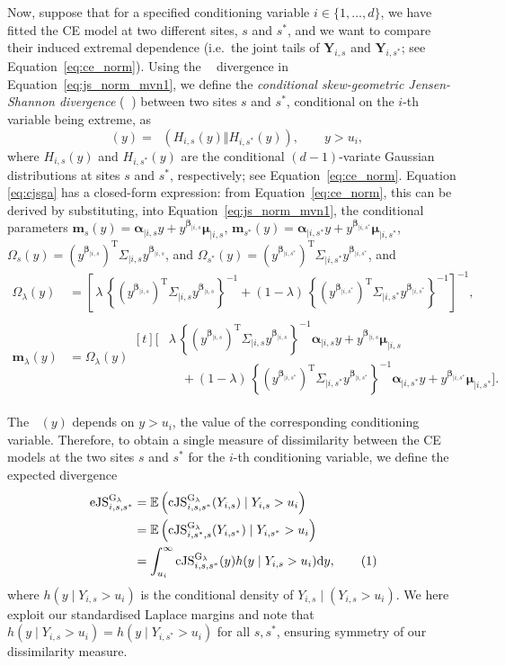 \documentclass[12pt,compact]{article}
\newcommand{\JSGa}{\mathop{\mathrm{JS}^{\mathrm{G}_{\lambda}}}\nolimits}
\newcommand{\cJSGa}[1]{\mathop{\mathrm{cJS}_{i, #1}^{\mathrm{G}_{\lambda}}}\nolimits}
\newcommand{\eJSGa}[1]{\mathop{\mathrm{eJS}_{i, #1}^{\mathrm{G}_{\lambda}}}\nolimits}
\newcommand\numberthis{\addtocounter{equation}{1}\tag{\theequation}}
\newcommand{\mvmean}[1]{\symbf{\alpha}_{\mid i, #1} y + y^{\symbf{\beta}_{\mid i, #1}} \symbf{\mu}_{\mid i, #1}}
\newcommand{\mvcov}[1]{\left(y^{\symbf{\beta}_{\mid i, #1}}\right)^{\mathrm{T}} \Sigma_{\mid i, #1} y^{\symbf{\beta}_{\mid i, #1}}}
\begin{document}
Now, suppose that for a specified conditioning variable $i \in \{1, \ldots, d\}$, we have fitted the CE model at two different sites, $s$ and $s^*$, and we want to compare their induced extremal dependence (i.e.\ the joint tails of $\boldsymbol{Y}_{i, s}$ and $\boldsymbol{Y}_{i, s^*}$; see Equation~\eqref{eq:ce_norm}). 
Using the $\JSGa{}$ divergence in Equation~\eqref{eq:js_norm_mvn1}, we define the \textit{conditional skew-geometric Jensen-Shannon divergence} ($\cJSGa{s, s^*}$) between two sites $s$ and $s^*$, conditional on the $i$-th variable being extreme, as
\begin{equation}\label{eq:cjsga}
  \cJSGa{s, s^*}(y) = \JSGa{}\left(H_{i, s}(y) \Vert H_{i, s^*}(y)\right),\qquad y > u_i,
\end{equation}
where $H_{i, s}(y)$ and $H_{i, s^*}(y)$ are the conditional $(d-1)$-variate Gaussian distributions at sites $s$ and $s^*$, respectively; see Equation~\eqref{eq:ce_norm}.
Equation \eqref{eq:cjsga} has a closed-form expression: from Equation~\eqref{eq:ce_norm}, this can be derived by substituting, into Equation~\eqref{eq:js_norm_mvn1}, the conditional parameters $\symbf{m}_{s}(y) = \mvmean{s}$, $\symbf{m}_{s^*}(y) = \mvmean{s^*}$, $\Omega_{s}(y) = \mvcov{s}$, and $\Omega_{s^*}(y) = \mvcov{s^*}$, 
and 
\begin{align*}
\Omega_{\lambda}(y)
  &= \left[\,\lambda\,\left\{\mvcov{s}\right\}^{-1}
           +(1-\lambda)\,\left\{\mvcov{s^{*}}\right\}^{-1}\right]^{-1},\\[6pt]
\symbf{m}_{\lambda}(y)
  &= \Omega_{\lambda}(y)
     \begin{aligned}[t]
       \Biggl[&\lambda\,\left\{\mvcov{s}\right\}^{-1}\mvmean{s}\\
            &\quad +(1-\lambda)\,\left\{\mvcov{s^{*}}\right\}^{-1}\mvmean{s^{*}}\Biggr].
     \end{aligned}
\end{align*}

The $\cJSGa{s, s^*}(y)$ depends on $y > u_i$, the value of the corresponding conditioning variable. 
Therefore, to obtain a single measure of dissimilarity between the CE models at the two sites $s$ and $s^*$ for the $i$-th conditioning variable, we define the expected divergence
\begin{align*}
  \eJSGa{s, s^*} &= \mathbb{E}\left(\cJSGa{s, s^*}(Y_{i,s}) \mid Y_{i,s} > u_i\right) \\
                 &= \mathbb{E}\left(\cJSGa{s^*, s}(Y_{i,s^*}) \mid Y_{i,s^*} > u_i\right) \\
                 &= \int_{u_i}^{\infty} \cJSGa{s, s^*}(y) h(y \mid Y_{i,s} > u_i) \mathrm{d}y, \numberthis \label{eq:jsga_integral}
\end{align*}
where $h(y \mid Y_{i, s} > u_i)$ is the conditional density of $Y_{i, s} \mid (Y_{i, s} > u_i)$.
We here exploit our standardised Laplace margins and note that $h(y \mid Y_{i, s} > u_i) = h(y \mid Y_{i, s^*} > u_i)$ for all $s, s^*$, ensuring symmetry of our dissimilarity measure.
\end{document}
